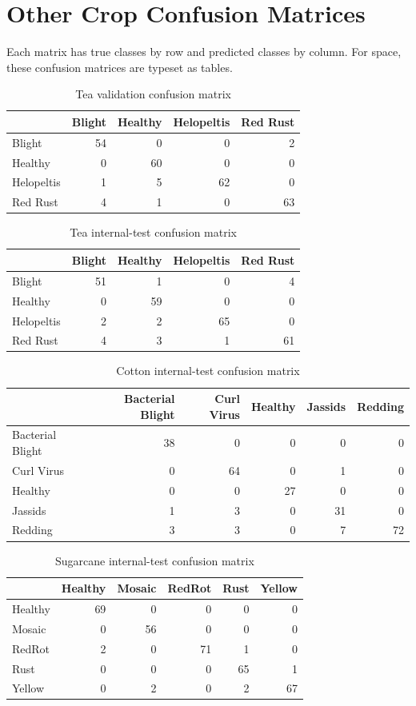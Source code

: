 \documentclass[12pt,a4paper,oneside]{report}
\begin{document}
\section{Other Crop Confusion Matrices}
Each matrix has true classes by row and predicted classes by column. For space, these confusion matrices are typeset as tables.
\begin{table}[H]\centering\scriptsize\caption{Tea validation confusion matrix}\begin{tabular}{lrrrr}\toprule & Blight & Healthy & Helopeltis & Red Rust\\\midrule Blight&54&0&0&2\\Healthy&0&60&0&0\\Helopeltis&1&5&62&0\\Red Rust&4&1&0&63\\\bottomrule\end{tabular}\end{table}
\begin{table}[H]\centering\scriptsize\caption{Tea internal-test confusion matrix}\begin{tabular}{lrrrr}\toprule & Blight & Healthy & Helopeltis & Red Rust\\\midrule Blight&51&1&0&4\\Healthy&0&59&0&0\\Helopeltis&2&2&65&0\\Red Rust&4&3&1&61\\\bottomrule\end{tabular}\end{table}
\begin{table}[H]\centering\scriptsize\caption{Cotton internal-test confusion matrix}\begin{tabular}{lrrrrr}\toprule & Bacterial Blight & Curl Virus & Healthy & Jassids & Redding\\\midrule Bacterial Blight&38&0&0&0&0\\Curl Virus&0&64&0&1&0\\Healthy&0&0&27&0&0\\Jassids&1&3&0&31&0\\Redding&3&3&0&7&72\\\bottomrule\end{tabular}\end{table}
\begin{table}[H]\centering\scriptsize\caption{Sugarcane internal-test confusion matrix}\begin{tabular}{lrrrrr}\toprule & Healthy & Mosaic & RedRot & Rust & Yellow\\\midrule Healthy&69&0&0&0&0\\Mosaic&0&56&0&0&0\\RedRot&2&0&71&1&0\\Rust&0&0&0&65&1\\Yellow&0&2&0&2&67\\\bottomrule\end{tabular}\end{table}
\end{document}
